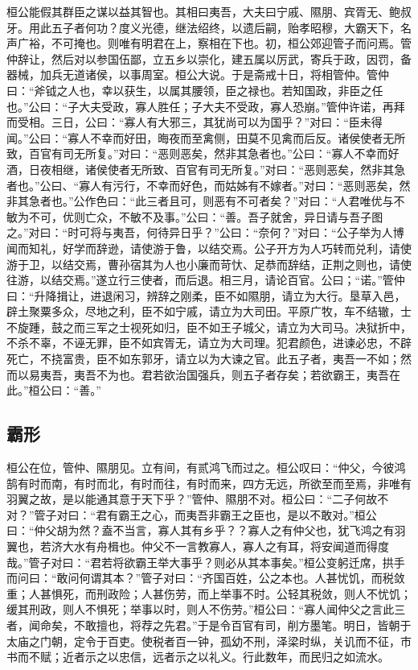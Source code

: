 \documentclass[]{article}
\begin{document}
桓公能假其群臣之谋以益其智也。其相曰夷吾，大夫曰宁戚、隰朋、宾胥无、鲍叔牙。用此五子者何功？度义光德，继法绍终，以遗后嗣，贻孝昭穆，大霸天下，名声广裕，不可掩也。则唯有明君在上，察相在下也。初，桓公郊迎管子而问焉。管仲辞让，然后对以参国伍鄙，立五乡以崇化，建五属以厉武，寄兵于政，因罚，备器械，加兵无道诸侯，以事周室。桓公大说。于是斋戒十日，将相管仲。管仲曰：``斧钺之人也，幸以获生，以属其腰领，臣之禄也。若知国政，非臣之任也。''公曰：``子大夫受政，寡人胜任；子大夫不受政，寡人恐崩。''管仲许诺，再拜而受相。三日，公曰：``寡人有大邪三，其犹尚可以为国乎？''对曰：``臣未得闻。''公曰：``寡人不幸而好田，晦夜而至禽侧，田莫不见禽而后反。诸侯使者无所致，百官有司无所复。''对曰：``恶则恶矣，然非其急者也。''公曰：``寡人不幸而好酒，日夜相继，诸侯使者无所致、百官有司无所复。''对曰：``恶则恶矣，然非其急者也。''公曰、``寡人有污行，不幸而好色，而姑姊有不嫁者。''对曰：``恶则恶矣，然非其急者也。''公作色曰：``此三者且可，则恶有不可者矣？''对曰：``人君唯优与不敏为不可，优则亡众，不敏不及事。''公曰：``善。吾子就舍，异日请与吾子图之。''对曰：``时可将与夷吾，何待异日乎？''公曰：``奈何？''对曰：``公子举为人博闻而知礼，好学而辞逊，请使游于鲁，以结交焉。公子开方为人巧转而兑利，请使游于卫，以结交焉，曹孙宿其为人也小廉而苛忕、足恭而辞结，正荆之则也，请使往游，以结交焉。''遂立行三使者，而后退。相三月，请论百官。公曰；``诺。''管仲曰：``升降揖让，进退闲习，辨辞之刚柔，臣不如隰朋，请立为大行。垦草入邑，辟土聚粟多众，尽地之利，臣不如宁戚，请立为大司田。平原广牧，车不结辙，士不旋踵，鼓之而三军之士视死如归，臣不如王子城父，请立为大司马。决狱折中，不杀不辜，不诬无罪，臣不如宾胥无，请立为大司理。犯君颜色，进谏必忠，不辟死亡，不挠富贵，臣不如东郭牙，请立以为大谏之官。此五子者，夷吾一不如；然而以易夷吾，夷吾不为也。君若欲治国强兵，则五子者存矣；若欲霸王，夷吾在此。''桓公曰：``善。''

\hypertarget{header-n354}{%
\subsection{霸形}\label{header-n354}}

桓公在位，管仲、隰朋见。立有间，有贰鸿飞而过之。桓公叹曰：``仲父，今彼鸿鹄有时而南，有时而北，有时而往，有时而来，四方无远，所欲至而至焉，非唯有羽翼之故，是以能通其意于天下乎？''管仲、隰朋不对。桓公曰：``二子何故不对？''管子对曰：``君有霸王之心，而夷吾非霸王之臣也，是以不敢对。''桓公曰：``仲父胡为然？盍不当言，寡人其有乡乎？？寡人之有仲父也，犹飞鸿之有羽翼也，若济大水有舟楫也。仲父不一言教寡人，寡人之有耳，将安闻道而得度哉。''管子对曰：``君若将欲霸王举大事乎？则必从其本事矣。''桓公变躬迁席，拱手而问曰：``敢问何谓其本？''管子对曰：``齐国百姓，公之本也。人甚忧饥，而税敛重；人甚惧死，而刑政险；人甚伤劳，而上举事不时。公轻其税敛，则人不忧饥；缓其刑政，则人不惧死；举事以时，则人不伤劳。''桓公曰：``寡人闻仲父之言此三者，闻命矣，不敢擅也，将荐之先君。''于是令百官有司，削方墨笔。明日，皆朝于太庙之门朝，定令于百吏。使税者百一钟，孤幼不刑，泽梁时纵，关讥而不征，市书而不赋；近者示之以忠信，远者示之以礼义。行此数年，而民归之如流水。
\end{document}
